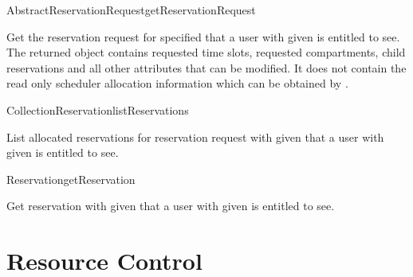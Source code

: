 \begin{Api}
\begin{ApiCmd}{AbstractReservationRequest}{getReservationRequest}%
%
%
\end{ApiCmd}
Get the reservation request for specified  that a user with given  is entitled to see. The returned object contains requested time slots, requested compartments, child reservations and all other attributes that can be modified. It does not contain the read only scheduler allocation information which can be obtained by .

\begin{ApiCmdCollection}{Collection}{Reservation}{listReservations}%
%
%
\end{ApiCmdCollection}
List allocated reservations for reservation request with given  that a user with given  is entitled to see.

\begin{ApiCmd}{Reservation}{getReservation}%
%
%
\end{ApiCmd}
Get reservation with given  that a user with given  is entitled to see.

\end{Api}

\section{Resource Control}

\todo{}



